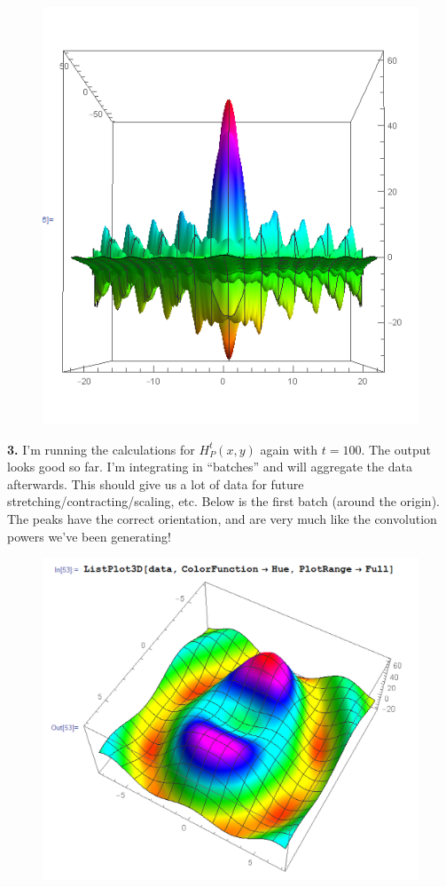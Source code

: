 \documentclass{article}
\theoremstyle{definition}
\begin{document}
\begin{figure}[!htb]
	\includegraphics[scale=0.3]{conv-5}
\end{figure}








\newpage

\noindent \textbf{3.} I'm running the calculations for $H^t_P(x,y)$ again with $t = 100$. The output looks good so far. I'm integrating in ``batches'' and will aggregate the data afterwards. This should give us a lot of data for future stretching/contracting/scaling, etc. Below is the first batch (around the origin). The peaks have the correct orientation, and are very much like the convolution powers we've been generating!

\begin{figure}[!htb]
	\centering
	\includegraphics[scale=0.25]{conv-6}
\end{figure}
\end{document}
